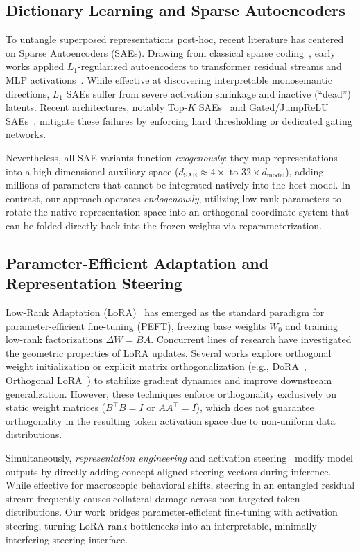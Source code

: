 \documentclass[10pt,twocolumn,letterpaper]{article}
\begin{document}
\subsection{Dictionary Learning and Sparse Autoencoders}
To untangle superposed representations post-hoc, recent literature has centered on Sparse Autoencoders (SAEs). Drawing from classical sparse coding~\cite{olshausen1996emergence}, early works applied $L_1$-regularized autoencoders to transformer residual streams and MLP activations~\cite{sharkey2022taking,cunningham2023sparse,bricken2023towards}. While effective at discovering interpretable monosemantic directions, $L_1$ SAEs suffer from severe activation shrinkage and inactive (``dead'') latents. Recent architectures, notably Top-$K$ SAEs~\cite{gao2024scaling} and Gated/JumpReLU SAEs~\cite{rajamanoharan2024improving}, mitigate these failures by enforcing hard thresholding or dedicated gating networks. 

Nevertheless, all SAE variants function \textit{exogenously}: they map representations into a high-dimensional auxiliary space ($d_{\text{SAE}} \approx 4\times \text{ to } 32\times d_{\text{model}}$), adding millions of parameters that cannot be integrated natively into the host model. In contrast, our approach operates \textit{endogenously}, utilizing low-rank parameters to rotate the native representation space into an orthogonal coordinate system that can be folded directly back into the frozen weights via reparameterization.

\subsection{Parameter-Efficient Adaptation and Representation Steering}
Low-Rank Adaptation (LoRA)~\cite{hu2021lora} has emerged as the standard paradigm for parameter-efficient fine-tuning (PEFT), freezing base weights $W_0$ and training low-rank factorizations $\Delta W = BA$. Concurrent lines of research have investigated the geometric properties of LoRA updates. Several works explore orthogonal weight initialization or explicit matrix orthogonalization (e.g., DoRA~\cite{liu2024dora}, Orthogonal LoRA~\cite{wang2023orthogonal}) to stabilize gradient dynamics and improve downstream generalization. However, these techniques enforce orthogonality exclusively on static weight matrices ($B^\top B = I$ or $A A^\top = I$), which does not guarantee orthogonality in the resulting token activation space due to non-uniform data distributions.

Simultaneously, \textit{representation engineering} and activation steering~\cite{rimsky2023steering,turner2023activation,zou2023representation} modify model outputs by directly adding concept-aligned steering vectors during inference. While effective for macroscopic behavioral shifts, steering in an entangled residual stream frequently causes collateral damage across non-targeted token distributions. Our work bridges parameter-efficient fine-tuning with activation steering, turning LoRA rank bottlenecks into an interpretable, minimally interfering steering interface.
\end{document}

